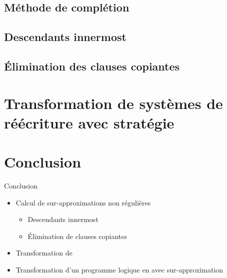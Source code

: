 \documentclass[xcolor={dvipsnames}]{beamer}
\begin{document}
\subsection{Méthode de complétion}


\subsection{Descendants innermost}


\subsection{Élimination des clauses copiantes}


\section{Transformation de systèmes de réécriture avec stratégie}


\section{Conclusion}

\begin{frame}{Conclusion}
  \begin{itemize}[<+->]
  \item Calcul de sur-approximations non régulières
    \begin{itemize}
    \item Descendants innermost
    \item Élimination de clauses copiantes
    \end{itemize}
  \item Transformation de \pctrs
  \item Transformation d'un programme logique en \csprogramme avec sur-approximation
  \end{itemize}
\end{frame}
\end{document}
